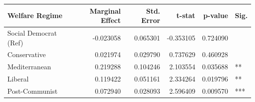 \begin{tabular}{lrrrrl}
\toprule
Welfare Regime & Marginal Effect & Std. Error & t-stat & p-value & Sig. \\
\midrule
Social Democrat (Ref) & -0.023058 & 0.065301 & -0.353105 & 0.724090 &  \\
Conservative & 0.021974 & 0.029790 & 0.737629 & 0.460928 &  \\
Mediterranean & 0.219288 & 0.104246 & 2.103554 & 0.035688 & ** \\
Liberal & 0.119422 & 0.051161 & 2.334264 & 0.019796 & ** \\
Post-Communist & 0.072940 & 0.028093 & 2.596409 & 0.009570 & *** \\
\bottomrule
\end{tabular}
